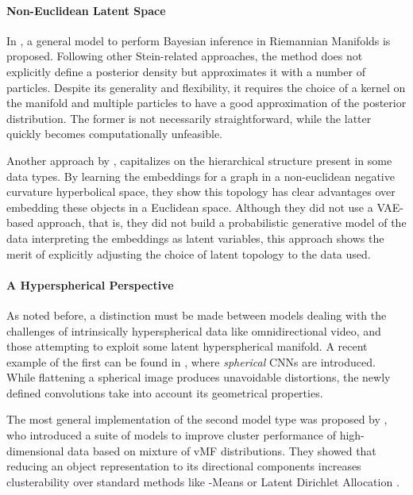 \documentclass[letterpaper]{article}
\begin{document}
\label{par:non-euclidean-latent-space}
\paragraph{Non-Euclidean Latent Space}
In \cite{riemann-stein}, a general model to perform Bayesian inference in Riemannian Manifolds is proposed. Following other Stein-related approaches, the method does not explicitly define a posterior density but approximates it with a number of particles. Despite its generality and flexibility, it requires the choice of a kernel on the manifold and multiple particles to have a good approximation of the posterior distribution. The former is not necessarily straightforward, while the latter quickly becomes computationally unfeasible. 

Another approach by \cite{nickel2017poincare}, capitalizes on the hierarchical structure present in some data types. By learning the embeddings for a graph in a non-euclidean negative curvature hyperbolical space, they show this topology has clear advantages over embedding these objects in a Euclidean space. Although they did not use a VAE-based approach, that is, they did not build a probabilistic generative model of the data interpreting the embeddings as latent variables, this approach shows the merit of explicitly adjusting the choice of latent topology to the data used.

\label{par:hyperspherical-perspective}
\paragraph{A Hyperspherical Perspective}
As noted before, a distinction must be made between models dealing with the challenges of intrinsically hyperspherical data like omnidirectional video, and those attempting to exploit some latent hyperspherical manifold. A recent example of the first can be found in \cite{s.2018spherical}, where \textit{spherical} CNNs are introduced. While flattening a spherical image produces unavoidable distortions, the newly defined convolutions take into account its geometrical properties. 

The most general implementation of the second model type was proposed by \cite{gopal2014mises}, who introduced a suite of models to improve cluster performance of high-dimensional data based on mixture of vMF distributions. They showed that reducing an object representation to its directional components increases clusterability over standard methods like -Means or Latent Dirichlet Allocation \citep{blei2003latent}.
\end{document}

